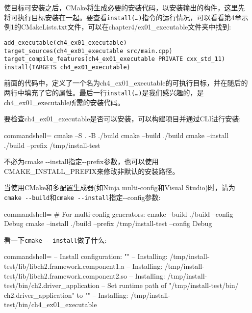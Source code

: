使目标可安装之后，CMake将生成必要的安装代码，以安装输出的构件，这里先将可执行目标安装在一起。要查看\texttt{install(…)}指令的运行情况，可以看看第4章示例1的CMakeLists.txt文件，可以在chapter4/ex01\_executable文件夹中找到:

\begin{lstlisting}[style=styleCMake]
add_executable(ch4_ex01_executable)
target_sources(ch4_ex01_executable src/main.cpp)
target_compile_features(ch4_ex01_executable PRIVATE cxx_std_11)
install(TARGETS ch4_ex01_executable)
\end{lstlisting}

前面的代码中，定义了一个名为ch4\_ex01\_executable的可执行目标，并在随后的两行中填充了它的属性。最后一行\texttt{install(…)}是我们感兴趣的，是ch4\_ex01\_executable所需的安装代码。

要检查ch4\_ex01\_executable是否可以安装，可以构建项目并通过CLI进行安装:

\begin{tcblisting}{commandshell={}}
cmake –S . -B ./build
cmake --build ./build
cmake --install ./build --prefix /tmp/install-test
\end{tcblisting}

\begin{tcolorbox}[colback=webgreen!5!white,colframe=webgreen!75!black,title=Note]
不必为cmake -{}-install指定-{}-prefix参数，也可以使用CMAKE\_INSTALL\_PREFIX来修改非默认的安装路径。

当使用CMake和多配置生成器(如Ninja multi-config和Visual Studio)时，请为\texttt{cmake -{}-build}和\texttt{cmake -{}-install}指定-{}-config参数:

\begin{tcblisting}{commandshell={}}
# For multi-config generators:
cmake --build ./build --config Debug
cmake --install ./build --prefix /tmp/install-test
--config Debug
\end{tcblisting}
\end{tcolorbox}

看一下\texttt{cmake -{}-install}做了什么:

\begin{tcblisting}{commandshell={}}
-- Install configuration: ""
-- Installing: /tmp/install-test/lib/libch2.framework.component1.a
-- Installing: /tmp/install-test/lib/libch2.framework.component2.so
-- Installing: /tmp/install-test/bin/ch2.driver_application
-- Set runtime path of "/tmp/install-test/bin/
    ch2.driver_application" to ""
-- Installing: /tmp/install-test/bin/ch4_ex01_executable
\end{tcblisting}

